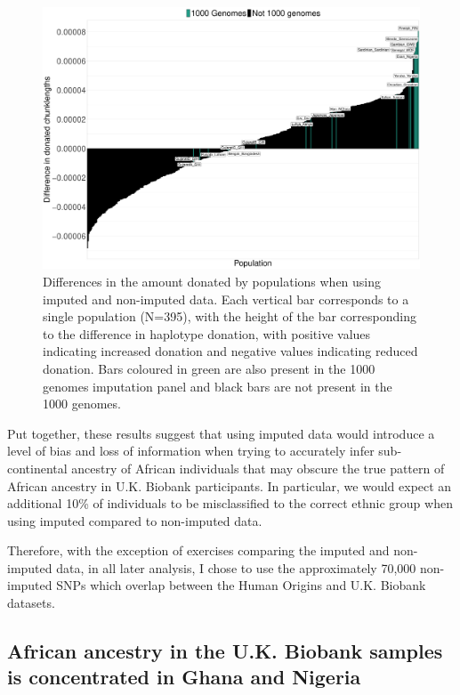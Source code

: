 \begin{figure}
	    \centering
	    \includegraphics[width=1.0\textwidth]{../images/chapter3/imputed_excess_copying_pops.pdf}
	    \caption{Differences in the amount donated by populations when using imputed and non-imputed data. Each vertical bar corresponds to a single population (N=395), with the height of the bar corresponding to the difference in haplotype donation, with positive values indicating increased donation and negative values indicating reduced donation. Bars coloured in green are also present in the 1000 genomes imputation panel and black bars are not present in the 1000 genomes.}
	    \label{fig:imputed_excess_copying_pops}
\end{figure}

Put together, these results suggest that using imputed data would introduce a level of bias and loss of information when trying to accurately infer sub-continental ancestry of African individuals that may obscure the true pattern of African ancestry in U.K. Biobank participants. In particular, we would expect an additional 10\% of individuals to be misclassified to the correct ethnic group when using imputed compared to non-imputed data.

Therefore, with the exception of exercises comparing the imputed and non-imputed data, in all later analysis, I chose to use the approximately 70,000 non-imputed SNPs which overlap between the Human Origins and U.K. Biobank datasets. 

\subsection{African ancestry in the U.K. Biobank samples is concentrated in Ghana and Nigeria}


